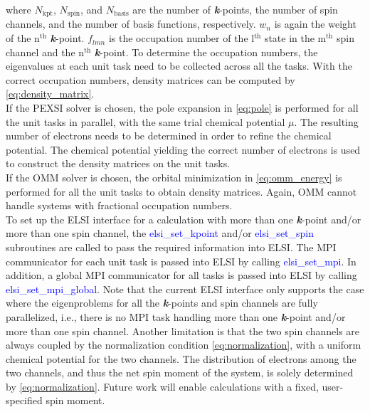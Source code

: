 \documentclass{report}
\begin{document}
\noindent where $N_\text{kpt}$, $N_\text{spin}$, and $N_\text{basis}$ are the number of \textbf{\textit{k}}-points, the number of spin channels, and the number of basis functions, respectively.  $w_n$ is again the weight of the n$^\text{th}$ \textbf{\textit{k}}-point.  $f_{lmn}$ is the occupation number of the l$^\text{th}$ state in the m$^\text{th}$ spin channel and the n$^\text{th}$ \textbf{\textit{k}}-point.  To determine the occupation numbers, the eigenvalues at each unit task need to be collected across all the tasks.  With the correct occupation numbers, density matrices can be computed by \ref{eq:density_matrix}.\\

If the PEXSI solver is chosen, the pole expansion in \ref{eq:pole} is performed for all the unit tasks in parallel, with the same trial chemical potential $\mu$.  The resulting number of electrons needs to be determined in order to refine the chemical potential.  The chemical potential yielding the correct number of electrons is used to construct the density matrices on the unit tasks.\\

If the OMM solver is chosen, the orbital minimization in \ref{eq:omm_energy} is performed for all the unit tasks to obtain density matrices.  Again, OMM cannot handle systems with fractional occupation numbers.\\

To set up the ELSI interface for a calculation with more than one \textbf{\textit{k}}-point and/or more than one spin channel,  the \textcolor{blue}{elsi\_set\_kpoint} and/or \textcolor{blue}{elsi\_set\_spin} subroutines are called to pass the required information into ELSI.  The MPI communicator for each unit task is passed into ELSI by calling \textcolor{blue}{elsi\_set\_mpi}.  In addition, a global MPI communicator for all tasks is passed into ELSI by calling \textcolor{blue}{elsi\_set\_mpi\_global}.  Note that the current ELSI interface only supports the case where the eigenproblems for all the \textbf{\textit{k}}-points and spin channels are fully parallelized, i.e., there is no MPI task handling more than one \textbf{\textit{k}}-point and/or more than one spin channel.  Another limitation is that the two spin channels are always coupled by the normalization condition \ref{eq:normalization}, with a uniform chemical potential for the two channels.  The distribution of electrons among the two channels, and thus the net spin moment of the system, is solely determined by \ref{eq:normalization}.  Future work will enable calculations with a fixed, user-specified spin moment.\\
\end{document}
